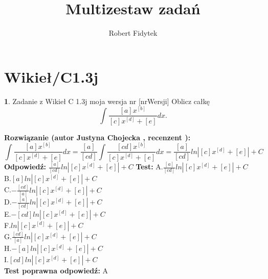 \documentclass[12pt, a4paper]{article}
\title{Multizestaw zadań}
\author{Robert Fidytek}
\date{}
\theoremstyle{definition} %
\newtheorem{zad}{}
\newcommand{\kategoria}[1]{\section{#1}} %
\newcommand{\zadStart}[1]{\begin{zad}#1\newline} %
\newcommand{\zadStop}{\end{zad}}   %
\newcommand{\rozwStart}[2]{\noindent \textbf{Rozwiązanie (autor #1 , recenzent #2): }\newline} %
\newcommand{\rozwStop}{\newline}                                            %
\newcommand{\odpStart}{\noindent \textbf{Odpowiedź:}\newline}    %
\newcommand{\odpStop}{\newline}                                             %
\newcommand{\testStart}{\noindent \textbf{Test:}\newline} %
\newcommand{\testStop}{\newline} %
\newcommand{\kluczStart}{\noindent \textbf{Test poprawna odpowiedź:}\newline} %
\newcommand{\kluczStop}{\newline} %
\begin{document}
\maketitle
\kategoria{Wikieł/C1.3j}
\zadStart{Zadanie z Wikieł C 1.3j moja wersja nr [nrWersji]}
Oblicz całkę $$\int \frac{[a]x^{[b]}}{[c]x^{[d]}+[e]} dx.$$
\zadStop
\rozwStart{Justyna Chojecka}{}
$$\int \frac{[a]x^{[b]}}{[c]x^{[d]}+[e]} dx=\frac{[a]}{[cd]}\int\frac{[cd]x^{[b]}}{[c]x^{[d]
}+[e]}dx=\frac{[a]}{[cd]}ln\left|[c]x^{[d]}+[e]\right|+C$$
\rozwStop
\odpStart
$\frac{[a]}{[cd]}ln\left|[c]x^{[d]}+[e]\right|+C$
\odpStop
\testStart
A.$\frac{[a]}{[cd]}ln\left|[c]x^{[d]}+[e]\right|+C$\\
B.$[a]ln\left|[c]x^{[d]}+[e]\right|+C$\\
C.$-\frac{[cd]}{[a]}ln\left|[c]x^{[d]}+[e]\right|+C$\\
D.$-\frac{[a]}{[cd]}ln\left|[c]x^{[d]}+[e]\right|+C$\\
E.$-[cd]ln\left|[c]x^{[d]}+[e]\right|+C$\\
F.$ln\left|[c]x^{[d]}+[e]\right|+C$\\
G.$\frac{[cd]}{[a]}ln\left|[c]x^{[d]}+[e]\right|+C$\\
H.$-[a]ln\left|[c]x^{[d]}+[e]\right|+C$\\
I.$[cd]ln\left|[c]x^{[d]}+[e]\right|+C$\\
\testStop
\kluczStart
A
\kluczStop
\end{document}
